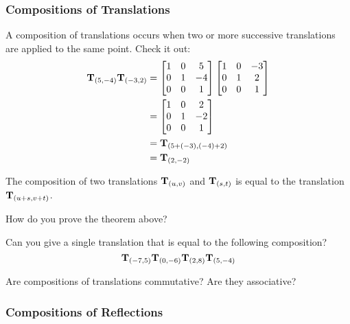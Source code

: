 \subsubsection{Compositions of Translations}

A composition of translations occurs when two or more successive
translations are applied to the same point. Check it out:
\begin{align*}
\mathbf{T}_{(5,-4)}\mathbf{T}_{(-3,2)} &= \begin{bmatrix}
1 & 0 &  5\\
0 & 1 & -4\\
0 & 0 &  1
\end{bmatrix}
\begin{bmatrix}
1 & 0 & -3\\
0 & 1 &  2\\
0 & 0 &  1
\end{bmatrix}\\
&=\begin{bmatrix}
1 & 0 &  2\\
0 & 1 & -2\\
0 & 0 &  1
\end{bmatrix}\\
&=\mathbf{T}_{(5+(-3),(-4)+2)}\\
&=\mathbf{T}_{(2,-2)}
\end{align*}

\begin{theorem}
The composition of two translations $\mathbf{T}_{(u,v)}$ and
$\mathbf{T}_{(s,t)}$ is equal to the translation $\mathbf{T}_{(u+s,v+t)}$.
\end{theorem}

\begin{question} How do you prove the theorem above?
\end{question}
\QM

\begin{question}
Can you give a single translation that is equal to the following composition?
\[
\mathbf{T}_{(-7,5)}\mathbf{T}_{(0,-6)}\mathbf{T}_{(2,8)}\mathbf{T}_{(5,-4)}
\]
\end{question}
\QM

\begin{question}
Are compositions of translations commutative?  Are they
associative?
\end{question}
\QM


\subsubsection{Compositions of Reflections}

